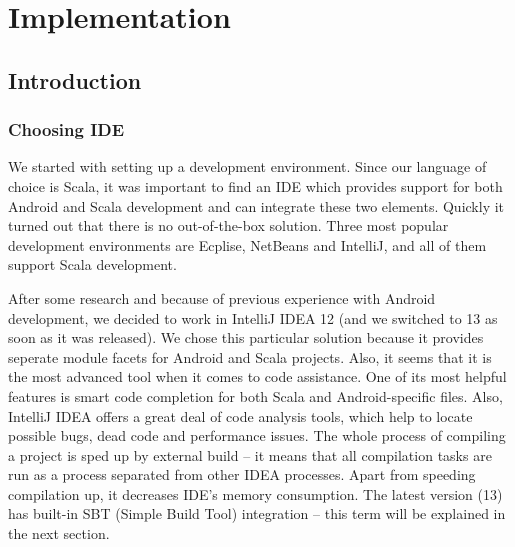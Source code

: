 %
%
%
%
%

\chapter{Implementation}
\label{chap:implementation}

\section{Introduction}
\label{sec:impl-intro}

\subsection{Choosing IDE}
\label{subsec:choosing-ide}
We started with setting up a development environment. Since our language of choice is Scala, it was important to find an IDE which provides support for both Android and Scala development and can integrate these two elements. Quickly it turned out that there is no out-of-the-box solution. Three most popular development environments are Ecplise, NetBeans and IntelliJ, and all of them support Scala development. 

After some research and because of previous experience with Android development, we decided to work in IntelliJ IDEA 12 (and we switched to 13 as soon as it was released). We chose this particular solution because it provides seperate module facets for Android and Scala projects\cite{Steingress:2011:AndroidScala}. Also, it seems that it is the most advanced tool when it comes to code assistance. One of its most helpful features is smart code completion for both Scala and Android-specific files\cite{Steingress:2011:AndroidScala}. Also, IntelliJ IDEA offers a great deal of code analysis tools, which help to locate possible bugs, dead code and performance issues. The whole process of compiling a project is sped up by external build -- it means that all compilation tasks are run as a process separated from other IDEA processes. Apart from speeding compilation up, it decreases IDE's memory consumption\cite{Fatin:2012:NewWay}. The latest version (13)  has built-in SBT (Simple Build Tool) integration -- this term will be explained in the next section. 


